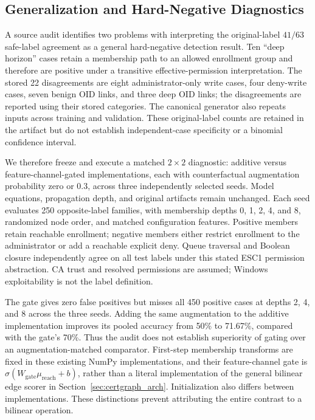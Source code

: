 \subsection{Generalization and Hard-Negative Diagnostics}
A source audit identifies two problems with interpreting the original-label $41/63$ safe-label agreement as a general hard-negative detection result. Ten ``deep horizon'' cases retain a membership path to an allowed enrollment group and therefore are positive under a transitive effective-permission interpretation. The stored 22 disagreements are eight administrator-only write cases, four deny-write cases, seven benign OID links, and three deep OID links; the disagreements are reported using their stored categories. The canonical generator also repeats inputs across training and validation. These original-label counts are retained in the artifact but do not establish independent-case specificity or a binomial confidence interval.

We therefore freeze and execute a matched $2\times2$ diagnostic: additive versus feature-channel-gated implementations, each with counterfactual augmentation probability zero or 0.3, across three independently selected seeds. Model equations, propagation depth, and original artifacts remain unchanged. Each seed evaluates 250 opposite-label families, with membership depths 0, 1, 2, 4, and 8, randomized node order, and matched configuration features. Positive members retain reachable enrollment; negative members either restrict enrollment to the administrator or add a reachable explicit deny. Queue traversal and Boolean closure independently agree on all test labels under this stated ESC1 permission abstraction. CA trust and resolved permissions are assumed; Windows exploitability is not the label definition.



The gate gives zero false positives but misses all 450 positive cases at depths 2, 4, and 8 across the three seeds. Adding the same augmentation to the additive implementation improves its pooled accuracy from 50\% to 71.67\%, compared with the gate's 70\%. Thus the audit does not establish superiority of gating over an augmentation-matched comparator. First-step membership transforms are fixed in these existing NumPy implementations, and their feature-channel gate is $\sigma(W_{\mathrm{gate}}\mu_{\mathrm{reach}}+b)$, rather than a literal implementation of the general bilinear edge scorer in Section~\ref{sec:certgraph_arch}. Initialization also differs between implementations. These distinctions prevent attributing the entire contrast to a bilinear operation.


